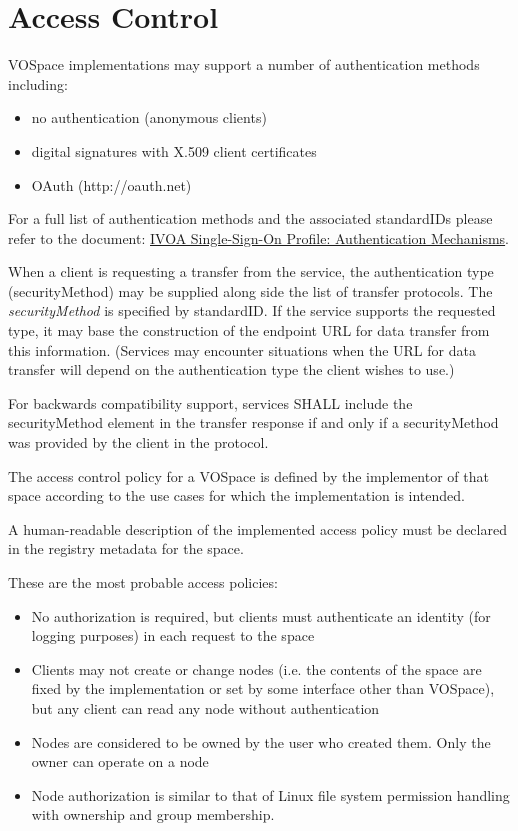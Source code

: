 \documentclass[11pt,a4paper]{ivoa}
\begin{document}
\section{Access Control}
\label{sec:access control}
VOSpace implementations may support a number of authentication methods including:

\begin{itemize}
    \item no authentication (anonymous clients)
    \item digital signatures with X.509 client certificates
    \item OAuth (http://oauth.net)
\end{itemize}

For a full list of authentication methods and the associated standardIDs please refer to the document: \href{http://www.ivoa.net/documents/latest/SSOAuthMech.html}{IVOA Single-Sign-On Profile: Authentication Mechanisms}. 	

When a client is requesting a transfer from the service, the authentication type (securityMethod) may be supplied along side the list of transfer protocols. The \emph{securityMethod} is specified by standardID.  If the service supports the requested type, it may base the construction of the endpoint URL for data transfer from this information.  (Services may encounter situations when the URL for data transfer will depend on the authentication type the client wishes to use.)

For backwards compatibility support, services SHALL include the securityMethod element in the transfer response if and only if a securityMethod was provided by the client in the protocol.

The access control policy for a VOSpace is defined by the implementor of that space according to the use cases for which the implementation is intended.

A human-readable description of the implemented access policy must be declared in the registry metadata for the space.

These are the most probable access policies:

\begin{itemize}
    \item No authorization is required, but clients must authenticate an identity (for logging purposes) in each request to the space
    \item Clients may not create or change nodes (i.e. the contents of the space are fixed by the implementation or set by some interface other than VOSpace), but any client can read any node without authentication
    \item Nodes are considered to be owned by the user who created them. Only the owner can operate on a node
    \item Node authorization is similar to that of Linux file system permission handling with ownership and group membership.
\end{itemize}
\end{document}
